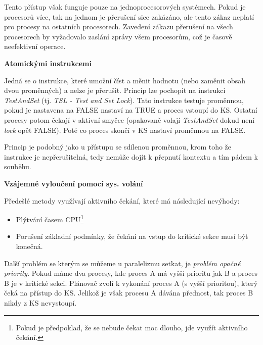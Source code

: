 \vspace{0,5cm}

Tento přístup však funguje pouze na jednoprocesorových systémech. Pokud je procesorů více, tak na jednom je přerušení sice zakázáno, ale tento zákaz neplatí pro procesy na ostatních procesorech. Zavedení zákazu přerušení na všech procesorech by vyžadovalo zaslání zprávy všem procesorům, což je časově neefektivní operace. 

\begin{large}
    \vspace{0,5cm}
    \textbf{Atomickými instrukcemi}    
\end{large}

Jedná se o instrukce, které umožní číst a měnit hodnotu (nebo zaměnit obsah dvou proměnných) a nelze je přerušit. Princip lze pochopit na instrukci \textit{TestAndSet} (tj. \textit{TSL - Test and Set Lock}). Tato instrukce testuje proměnnou, pokud je nastavena na FALSE nastaví na TRUE a proces vstoupí do KS. Ostatní procesy potom čekají v aktivní smyčce (opakovaně volají \textit{TestAndSet} dokud není \textit{lock} opět FALSE). Poté co proces skončí v KS nastaví proměnnou na FALSE. 

\vspace{0,5cm}

Princip je podobný jako u přístupu se sdílenou proměnnou, krom toho že instrukce je nepřerušitelná, tedy nemůže dojít k přepnutí kontextu a tím pádem k souběhu. 

\begin{large}
    \vspace{0,5cm}
    \textbf{Vzájemné vyloučení pomocí sys. volání}    
\end{large}

Předešlé metody využívají aktivního čekání, které má následující nevýhody:
\begin{itemize}
    \item Plýtvání časem CPU\footnote{Pokud je předpoklad, že se nebude čekat moc dlouho, jde využít aktivního čekání.}
    \item Porušení základní podmínky, že čekání na vstup do kritické sekce musí být konečná.
\end{itemize}

Další problém se kterým se můžeme u paralelizmu setkat, je \textit{problém opačné priority}. Pokud máme dva procesy, kde proces A má vyšší prioritu jak B a proces B je v kritické sekci. Plánovač zvolí k vykonání proces A (s vyšší prioritou), který čeká na přístup do KS. Jelikož je však procesu A dávána přednost, tak proces B nikdy z KS nevystoupí. 

